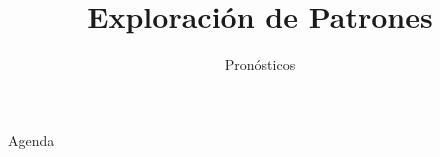 \documentclass[../main.tex]{subfiles}
\title{Exploración de Patrones}
\subtitle{Pronósticos} %
\begin{document}
\begin{frame}
  \maketitle
\end{frame}


     \begin{frame}{Agenda}
   \tableofcontents
 \end{frame}





\begin{frame}
  \maketitle
\end{frame}
\end{document}
